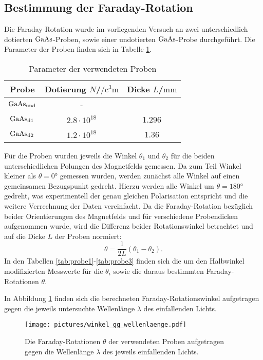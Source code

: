 \subsection{Bestimmung der Faraday-Rotation}
Die Faraday-Rotation wurde im vorliegenden Versuch an zwei unterschiedlich dotierten $\ce{GaAs}$-Proben, sowie einer undotierten $\ce{GaAs}$-Probe durchgeführt.
Die Parameter der Proben finden sich in Tabelle \ref{tab:params}.
\begin{table}
  \centering
  \caption{Parameter der verwendeten Proben}
  \label{tab:params}
  \begin{tabular}{ccc}
    \toprule
    Probe&Dotierung $N$/$\si{\per\cubic\centi\metre}$&Dicke $L$/$\si{\milli\meter}$\\
    \midrule
    $\ce{GaAs}_{\mathrm{und}}$&-&\\
    $\ce{GaAs}_{\mathrm{d1}}$&$2.8\cdot 10^{18}$&1.296\\
    $\ce{GaAs}_{\mathrm{d2}}$&$1.2\cdot 10^{18}$&1.36\\
    \bottomrule
  \end{tabular}
\end{table}

Für die Proben wurden jeweils die Winkel $\theta_1$ und $\theta_2$ für die beiden unterschiedlichen Polungen des Magnetfelds gemessen. Da zum Teil Winkel kleiner als $\theta=\ang{0}$ gemessen wurden, werden zunächst  alle Winkel auf einen gemeinsamen Bezugspunkt gedreht. Hierzu werden alle Winkel um $\theta=\ang{180}$ gedreht, was experimentell der genau gleichen Polarisation entspricht und die weitere Verrechnung der Daten vereinfacht.
Da die Faraday-Rotation bezüglich beider Orientierungen des Magnetfelds und für verschiedene Probendicken aufgenommen wurde, wird die Differenz beider Rotationswinkel betrachtet und auf die Dicke $L$ der Proben normiert:
\begin{equation}
  \theta=\frac{1}{2L}\left(\theta_1-\theta_2\right)\mathrm{.}
\end{equation}
In den Tabellen \ref{tab:probe1}-\ref{tab:probe3} finden sich die um den Halbwinkel modifizierten Messwerte für die $\theta_i$ sowie die daraus bestimmten Faraday-Rotationen $\theta$.



In Abbildung \ref{fig:faraday} finden sich die berechneten Faraday-Rotationswinkel aufgetragen gegen die jeweils untersuchte Wellenlänge $\lambda$ des einfallenden Lichts.

\begin{figure}
  \centering
  \texttt{[image: pictures/winkel\_gg\_wellenlaenge.pdf]}
  \caption{Die Faraday-Rotationen $\theta$ der verwendeten Proben aufgetragen gegen die Wellenlänge $\lambda$ des jeweils einfallenden Lichts.}
  \label{fig:faraday}
\end{figure}
\FloatBarrier

